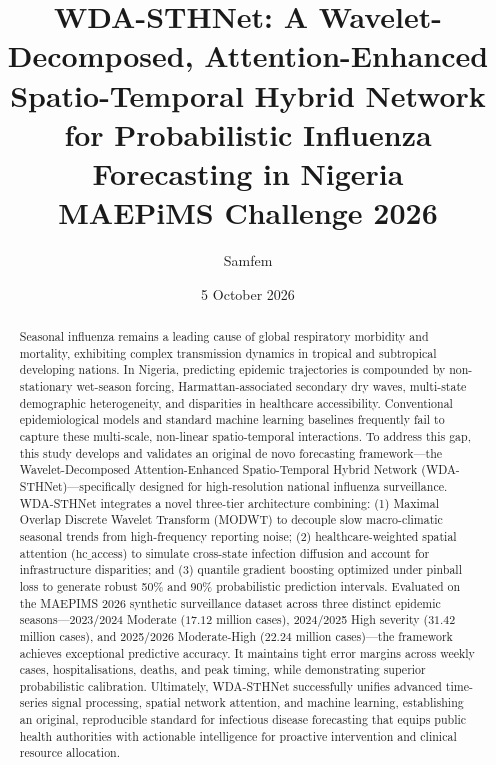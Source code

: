 \documentclass[11pt,a4paper]{article}
\title{\textbf{WDA-STHNet: A Wavelet-Decomposed, Attention-Enhanced Spatio-Temporal Hybrid Network for Probabilistic Influenza Forecasting in Nigeria}\\[4pt]\large MAEPiMS Challenge 2026}
\author{Samfem}
\date{5 October 2026}
\begin{document}
\maketitle
\begin{abstract}
	Seasonal influenza remains a leading cause of global respiratory morbidity and mortality, exhibiting complex transmission dynamics in tropical and subtropical developing nations. In Nigeria, predicting epidemic trajectories is compounded by non-stationary wet-season forcing, Harmattan-associated secondary dry waves, multi-state demographic heterogeneity, and disparities in healthcare accessibility. Conventional epidemiological models and standard machine learning baselines frequently fail to capture these multi-scale, non-linear spatio-temporal interactions. To address this gap, this study develops and validates an original de novo forecasting framework—the Wavelet-Decomposed Attention-Enhanced Spatio-Temporal Hybrid Network (WDA-STHNet)—specifically designed for high-resolution national influenza surveillance. WDA-STHNet integrates a novel three-tier architecture combining: (1) Maximal Overlap Discrete Wavelet Transform (MODWT) to decouple slow macro-climatic seasonal trends from high-frequency reporting noise; (2) healthcare-weighted spatial attention ($\text{hc\_access}$) to simulate cross-state infection diffusion and account for infrastructure disparities; and (3) quantile gradient boosting optimized under pinball loss to generate robust 50\% and 90\% probabilistic prediction intervals. Evaluated on the MAEPIMS 2026 synthetic surveillance dataset across three distinct epidemic seasons—2023/2024 Moderate ($17.12$ million cases), 2024/2025 High severity ($31.42$ million cases), and 2025/2026 Moderate-High ($22.24$ million cases)—the framework achieves exceptional predictive accuracy. It maintains tight error margins across weekly cases, hospitalisations, deaths, and peak timing, while demonstrating superior probabilistic calibration. Ultimately, WDA-STHNet successfully unifies advanced time-series signal processing, spatial network attention, and machine learning, establishing an original, reproducible standard for infectious disease forecasting that equips public health authorities with actionable intelligence for proactive intervention and clinical resource allocation.
\end{abstract}
\end{document}

